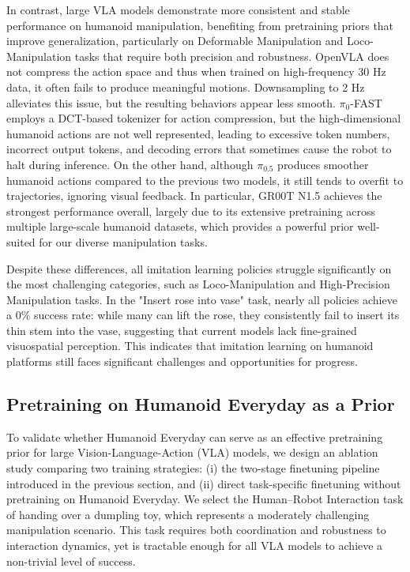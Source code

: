 \documentclass[letterpaper, 10pt, conference]{ieeeconf}
\begin{document}
In contrast, large VLA models demonstrate more consistent and stable performance on humanoid manipulation, benefiting from pretraining priors that improve generalization, particularly on Deformable Manipulation and Loco-Manipulation tasks that require both precision and robustness. OpenVLA does not compress the action space and thus when trained on high-frequency 30 Hz data, it often fails to produce meaningful motions. Downsampling to 2 Hz alleviates this issue, but the resulting behaviors appear less smooth. $\pi_{0}$-FAST employs a DCT-based tokenizer for action compression, but the high-dimensional humanoid actions are not well represented, leading to excessive token numbers, incorrect output tokens, and decoding errors that sometimes cause the robot to halt during inference. On the other hand, although $\pi_{0.5}$ produces smoother humanoid actions compared to the previous two models, it still tends to overfit to trajectories, ignoring visual feedback. In particular, GR00T N1.5 achieves the strongest performance overall, largely due to its extensive pretraining across multiple large-scale humanoid datasets, which provides a powerful prior well-suited for our diverse manipulation tasks.\par

Despite these differences, all imitation learning policies struggle significantly on the most challenging categories, such as Loco-Manipulation and High-Precision Manipulation tasks. In the "Insert rose into vase" task, nearly all policies achieve a 0\% success rate: while many can lift the rose, they consistently fail to insert its thin stem into the vase, suggesting that current models lack fine-grained visuospatial perception. This indicates that imitation learning on humanoid platforms still faces significant challenges and opportunities for progress.


\subsection{Pretraining on Humanoid Everyday as a Prior}
To validate whether Humanoid Everyday can serve as an effective pretraining prior for large Vision-Language-Action (VLA) models, we design an ablation study comparing two training strategies: (i) the two-stage finetuning pipeline introduced in the previous section, and (ii) direct task-specific finetuning without pretraining on Humanoid Everyday. We select the Human–Robot Interaction task of handing over a dumpling toy, which represents a moderately challenging manipulation scenario. This task requires both coordination and robustness to interaction dynamics, yet is tractable enough for all VLA models to achieve a non-trivial level of success.
\end{document}
